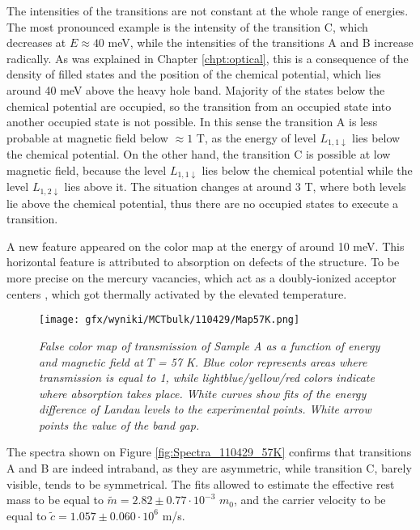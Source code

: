 \documentclass[titlepage,a4paper]{book}
\begin{document}
The intensities of the transitions are not constant at the whole range of energies. The most pronounced example is the intensity of the transition C, which decreases at $E \approx 40$ meV, while the intensities of the transitions A and B increase radically. As was explained in Chapter \ref{chpt:optical}, this is a consequence of the density of filled states and the position of the chemical potential, which lies around 40 meV above the heavy hole band. Majority of the states below the chemical potential are occupied, so the transition from an occupied state into another occupied state is not possible. In this sense the transition A is less probable at magnetic field below $\approx 1$ T, as the energy of level $L_{1,1\downarrow}$ lies below the chemical potential. On the other hand, the transition C is possible at low magnetic field, because the level $L_{1,1\downarrow}$ lies below the chemical potential while the level $L_{1,2\downarrow}$ lies above it. The situation changes at around 3 T, where both levels lie above the chemical potential, thus there are no occupied states to execute a transition. 
 
A new feature appeared on the color map at the energy of around 10 meV. This horizontal feature is attributed to absorption on defects of the structure. To be more precise on the mercury vacancies, which act as a doubly-ionized acceptor centers \cite{Kozlov_MCT_bulk}, which got thermally activated by the elevated temperature.

\begin{figure}[ht]
	\centering
	\texttt{[image: gfx/wyniki/MCTbulk/110429/Map57K.png]}
	\vspace{-10pt}
	\caption{\textit{False color map of transmission of Sample A as a function of energy and magnetic field at $T$ = 57 K. Blue color represents areas where transmission is equal to 1, while lightblue/yellow/red colors indicate where absorption takes place. White curves show fits of the energy difference of Landau levels to the experimental points. White arrow points the value of the band gap.}}
	\label{fig:Map_110429_57K}
\end{figure} 

The spectra shown on Figure \ref{fig:Spectra_110429_57K} confirms that transitions A and B are indeed intraband, as they are asymmetric, while transition C, barely visible, tends to be symmetrical. The fits allowed to estimate the effective rest mass to be equal to $\tilde m = 2.82 \pm 0.77 \cdot 10^{-3}$ $m_0$, and the carrier velocity to be equal to $\tilde{c} = 1.057 \pm 0.060 \cdot 10^6$ m/s. 
\end{document}
